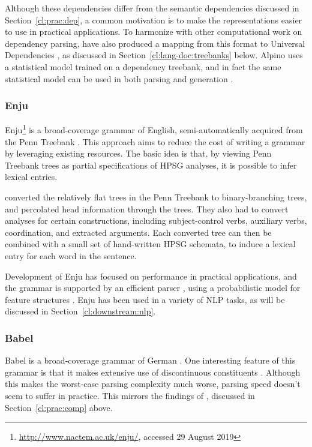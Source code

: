 \documentclass[output=paper,nonflat]{langsci/langscibook}
\begin{document}
Although these dependencies differ from the semantic dependencies discussed in Section~\ref{cl:prac:dep},
a common motivation is to make the representations easier to use in practical applications.
To harmonize with other computational work on dependency parsing,
\citet{Bou:Van:17} have also produced a mapping from this format
to Universal Dependencies \citep[UD;][]{Niv:Mar:Gin:16},
as discussed in Section~\ref{cl:lang-doc:treebanks} below.
Alpino uses a statistical model trained on a dependency treebank,
and in fact the same statistical model can be used in both parsing and generation \citep{dekok2011reversible}.


\subsubsection{Enju}
\label{cl:other:enju}

Enju\footnote{%
	\url{http://www.nactem.ac.uk/enju/}, accessed 29 August 2019
}
is a broad-coverage grammar of English,
semi-automatically acquired from the Penn Treebank \citep{MNT2005a-u}.
This approach aims to reduce the cost of writing a grammar
by leveraging existing resources.
The basic idea is that, by viewing Penn Treebank trees as partial specifications of HPSG analyses,
it is possible to infer lexical entries.

\citeauthor{MNT2005a-u} converted the relatively flat trees in the Penn Treebank to binary-branching trees,
and percolated head information through the trees.
They also had to convert analyses for certain constructions,
including subject-control verbs, auxiliary verbs, coordination, and extracted arguments.
Each converted tree can then be combined with a small set of hand-written HPSG schemata,
to induce a lexical entry for each word in the sentence.

Development of Enju has focused on performance in practical applications,
and the grammar is supported by an efficient parser \citep{tsuruoka2004enju,matsuzaki2007supertag},
using a probabilistic model for feature structures \citep{MT2008a-u}.
Enju has been used in a variety of NLP tasks, as will be discussed in Section~\ref{cl:downstream:nlp}.


\subsubsection{Babel}
\label{cl:other:babel}

Babel is a broad-coverage grammar of German \citep{Babel,Mueller99a}.
One interesting feature of this grammar is that
it makes extensive use of discontinuous constituents \citep{Mueller2004b}.
Although this makes the worst-case parsing complexity much worse,
parsing speed doesn't seem to suffer in practice.
This mirrors the findings of \citet{Carroll94},
discussed in Section~\ref{cl:prac:comp} above.
\end{document}
